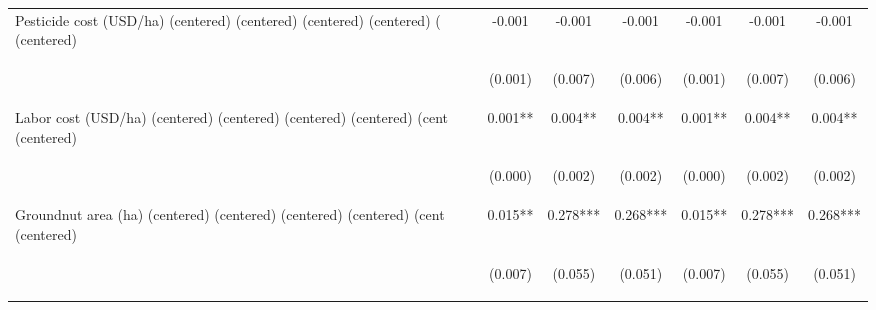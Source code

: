 \begin{center}
\begin{tabular}{lcccccc}
Pesticide cost (USD/ha) (centered) (centered) (centered) (centered) ( (centered) & -0.001 & -0.001 & -0.001 & -0.001 & -0.001 & -0.001 \\
\vspace{4pt} & \begin{footnotesize}(0.001)\end{footnotesize} & \begin{footnotesize}(0.007)\end{footnotesize} & \begin{footnotesize}(0.006)\end{footnotesize} & \begin{footnotesize}(0.001)\end{footnotesize} & \begin{footnotesize}(0.007)\end{footnotesize} & \begin{footnotesize}(0.006)\end{footnotesize} \\
Labor cost (USD/ha) (centered) (centered) (centered) (centered) (cent (centered) & 0.001** & 0.004** & 0.004** & 0.001** & 0.004** & 0.004** \\
\vspace{4pt} & \begin{footnotesize}(0.000)\end{footnotesize} & \begin{footnotesize}(0.002)\end{footnotesize} & \begin{footnotesize}(0.002)\end{footnotesize} & \begin{footnotesize}(0.000)\end{footnotesize} & \begin{footnotesize}(0.002)\end{footnotesize} & \begin{footnotesize}(0.002)\end{footnotesize} \\
Groundnut area (ha) (centered) (centered) (centered) (centered) (cent (centered) & 0.015** & 0.278*** & 0.268*** & 0.015** & 0.278*** & 0.268*** \\
\vspace{4pt} & \begin{footnotesize}(0.007)\end{footnotesize} & \begin{footnotesize}(0.055)\end{footnotesize} & \begin{footnotesize}(0.051)\end{footnotesize} & \begin{footnotesize}(0.007)\end{footnotesize} & \begin{footnotesize}(0.055)\end{footnotesize} & \begin{footnotesize}(0.051)\end{footnotesize} \\

\end{tabular}
\end{center}
